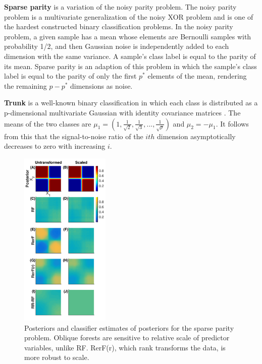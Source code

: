 \documentclass{article}
\begin{document}
\textbf{Sparse parity} is a variation of the noisy parity problem. The noisy parity problem is a multivariate generalization of the noisy XOR problem and is one of the hardest constructed binary classification problems. In the noisy parity problem, a given sample has a mean whose elements are Bernoulli samples with probability 1/2, and then Gaussian noise is independently added to each dimension with the same variance.  A sample's class label is equal to the parity of its mean. Sparse parity is an adaption of this problem in which the sample's class label is equal to the parity of only the first $p^*$ elements of the mean, rendering the remaining $p - p^*$ dimensions as noise.

\textbf{Trunk} is a well-known binary classification in which each class is distributed as a p-dimensional multivariate Gaussian with identity covariance matrices \cite{Trunk1979}. The means of the two classes are $\mu_1 = (1,\frac{1}{\sqrt{2}},\frac{1}{\sqrt{3}},...,\frac{1}{\sqrt{p}})$ and $\mu_2 = -\mu_1$. It follows from this that the signal-to-noise ratio of the $ith$ dimension asymptotically decreases to zero with increasing $i$.

\begin{figure}
\begin{center}
\includegraphics[width=0.38\textwidth] {Fig1_posteriors}
\caption{Posteriors and classifier estimates of posteriors for the sparse parity problem. Oblique forests are sensitive to relative scale of predictor variables, unlike RF. RerF(r), which rank transforms the data, is more robust to scale.}
\label{posteriors}
\end{center}
\end{figure}
\end{document}
